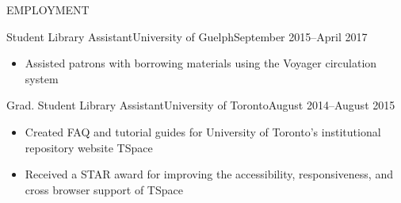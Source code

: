 \documentclass[]{mcdowellcv}
\begin{document}
	\begin{cvsection}{EMPLOYMENT}
		\begin{cvsubsection}{Student Library Assistant}{University of Guelph}{September 2015--April 2017}
			\begin{itemize}
				\item Assisted patrons with borrowing materials using the Voyager circulation system
			\end{itemize}
		\end{cvsubsection}
		
		
		\begin{cvsubsection}{Grad. Student Library Assistant}{University of Toronto}{August 2014--August 2015}		
			\begin{itemize}
	    	\item Created FAQ and tutorial guides for University of Toronto's institutional repository website TSpace
        \item Received a STAR award for improving the accessibility, responsiveness, and cross browser support of TSpace 
			\end{itemize}
		\end{cvsubsection}
		
	\end{cvsection}
\end{document}
